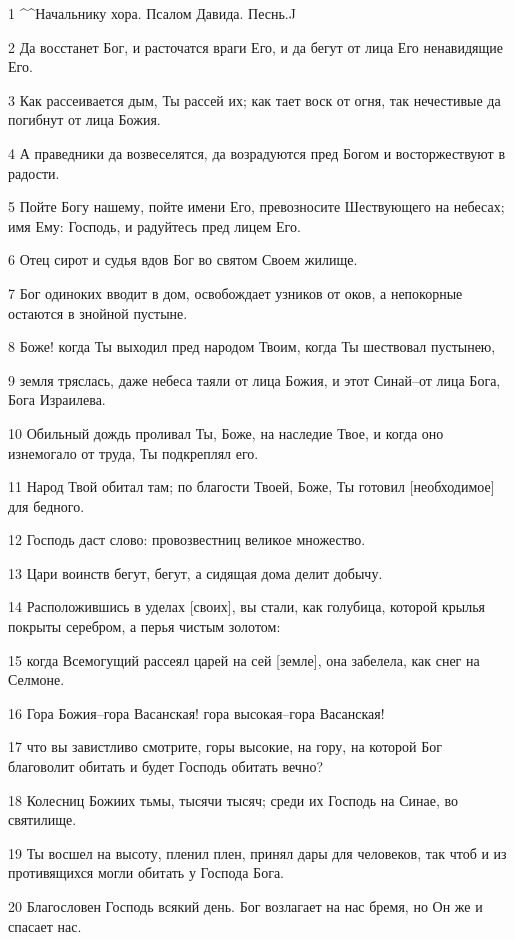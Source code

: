 \par 1 ^^Начальнику хора. Псалом Давида. Песнь.^^
\par 2 Да восстанет Бог, и расточатся враги Его, и да бегут от лица Его ненавидящие Его.
\par 3 Как рассеивается дым, Ты рассей их; как тает воск от огня, так нечестивые да погибнут от лица Божия.
\par 4 А праведники да возвеселятся, да возрадуются пред Богом и восторжествуют в радости.
\par 5 Пойте Богу нашему, пойте имени Его, превозносите Шествующего на небесах; имя Ему: Господь, и радуйтесь пред лицем Его.
\par 6 Отец сирот и судья вдов Бог во святом Своем жилище.
\par 7 Бог одиноких вводит в дом, освобождает узников от оков, а непокорные остаются в знойной пустыне.
\par 8 Боже! когда Ты выходил пред народом Твоим, когда Ты шествовал пустынею,
\par 9 земля тряслась, даже небеса таяли от лица Божия, и этот Синай--от лица Бога, Бога Израилева.
\par 10 Обильный дождь проливал Ты, Боже, на наследие Твое, и когда оно изнемогало от труда, Ты подкреплял его.
\par 11 Народ Твой обитал там; по благости Твоей, Боже, Ты готовил [необходимое] для бедного.
\par 12 Господь даст слово: провозвестниц великое множество.
\par 13 Цари воинств бегут, бегут, а сидящая дома делит добычу.
\par 14 Расположившись в уделах [своих], вы стали, как голубица, которой крылья покрыты серебром, а перья чистым золотом:
\par 15 когда Всемогущий рассеял царей на сей [земле], она забелела, как снег на Селмоне.
\par 16 Гора Божия--гора Васанская! гора высокая--гора Васанская!
\par 17 что вы завистливо смотрите, горы высокие, на гору, на которой Бог благоволит обитать и будет Господь обитать вечно?
\par 18 Колесниц Божиих тьмы, тысячи тысяч; среди их Господь на Синае, во святилище.
\par 19 Ты восшел на высоту, пленил плен, принял дары для человеков, так чтоб и из противящихся могли обитать у Господа Бога.
\par 20 Благословен Господь всякий день. Бог возлагает на нас бремя, но Он же и спасает нас.
